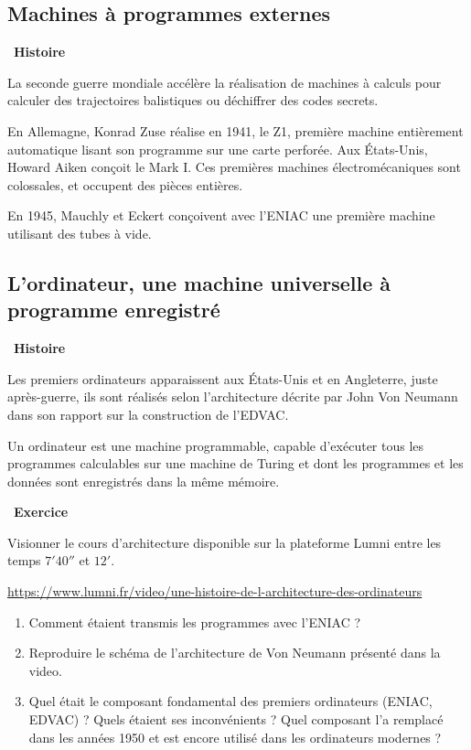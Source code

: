 \documentclass[a4paper, french, 11pt]{article}  %
\newcounter{cours}
\newcounter{exercice}
\newenvironment{exercice}[1]
{\par \medskip   \addtocounter{exercice}{1} \noindent  
\begin{bclogo}[arrondi =0.1,   noborder = true, logo=\bccrayon, marge=4]{~\textbf{Exercice} \textbf{\theexercice} {\itshape #1} }  \par}
{
\end{bclogo}
 \par \bigskip }
\newcounter{prog}
\newcounter{histo}
\newenvironment{histoire}[1]
{\par \medskip   \addtocounter{histo}{1} \noindent  
 \begin {bclogo}[couleur = blue!10 , arrondi =0.1,logo=\bchorloge, marge=4] {~\textbf{Histoire} \textbf{\thehisto} {\itshape #1} }  \par}
{
\end{bclogo}
 \par \bigskip }
\begin{document}
\subsection{Machines à programmes externes} 

\begin{histoire}{}
La seconde guerre mondiale accélère la réalisation de machines à calculs pour calculer des trajectoires balistiques ou déchiffrer des codes secrets. 

En Allemagne, Konrad Zuse réalise en 1941, le Z1, première machine entièrement automatique lisant son programme sur une carte perforée. Aux États-Unis, Howard Aiken conçoit le Mark I. Ces premières machines électromécaniques sont colossales, et occupent des pièces entières. 

En 1945,  Mauchly et Eckert conçoivent avec l'ENIAC une première machine utilisant des tubes à vide.

\end{histoire}



\subsection{L'ordinateur, une machine universelle à programme enregistré}

\begin{histoire}{}
Les premiers ordinateurs apparaissent aux États-Unis et en Angleterre, juste après-guerre, ils sont réalisés selon l'architecture décrite par John Von Neumann dans son rapport sur la construction de l'EDVAC.

Un ordinateur est une machine programmable, capable d'exécuter tous les programmes calculables sur une machine de Turing et dont les programmes et les données sont enregistrés dans la même mémoire.



\end{histoire}


\begin{exercice}{}

Visionner le cours d'architecture disponible sur la plateforme Lumni entre les temps $7'40''$ et $12'$.

\url{https://www.lumni.fr/video/une-histoire-de-l-architecture-des-ordinateurs} 


\begin{enumerate}
	\item Comment étaient transmis les programmes avec  l'ENIAC ? 
	\item Reproduire le schéma de l'architecture de Von Neumann présenté dans la video. 
	\item Quel était le composant fondamental des premiers ordinateurs (ENIAC, EDVAC) ? Quels étaient ses inconvénients ? Quel composant l'a remplacé dans les années 1950 et est encore utilisé dans les ordinateurs modernes ?
\end{enumerate}

\end{exercice}
\end{document}
